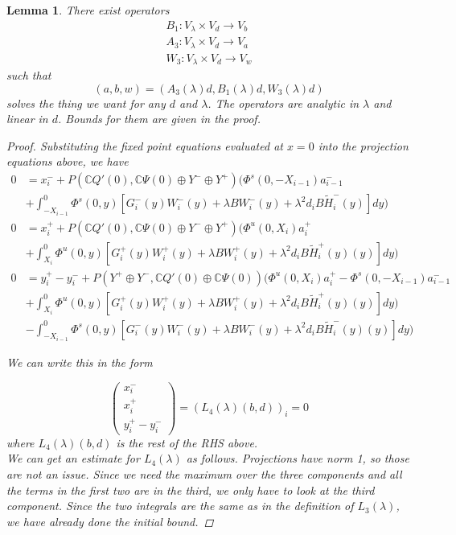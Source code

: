\documentclass[12pt]{article}
\def\C{{\mathbb C}}
\newtheorem{lemma}{Lemma}
\begin{document}
\begin{lemma}
There exist operators 
\begin{align*}
B_1: V_\lambda \times V_d \rightarrow V_b \\
A_3: V_\lambda \times V_d \rightarrow V_a \\
W_3: V_\lambda \times V_d \rightarrow V_w
\end{align*}
such that 
\[
(a,b,w) = (A_3(\lambda)d, B_1(\lambda)d, W_3(\lambda)d)
\]
solves the thing we want for any $d$ and $\lambda$. The operators are analytic in $\lambda$ and linear in $d$. Bounds for them are given in the proof.

\begin{proof}
Substituting the fixed point equations evaluated at $x = 0$ into the projection equations above, we have 
\begin{align*}
0 &= x_i^- + P(\C Q'(0), \C\Psi(0) \oplus Y^- \oplus Y^+) \Big( \Phi^s(0, -X_{i-1})a^-_{i-1}  \\
&+ \int_{-X_{i-1}}^0 \Phi^s(0, y)[G_i^-(y) W_i^-(y) + \lambda B W_i^-(y) + \lambda^2 d_i B \tilde{H}_i^-(y) ] dy \Big) \\
0 &= x_i^+ + P(\C Q'(0), \C\Psi(0) \oplus Y^- \oplus Y^+) \Big( \Phi^u(0, X_i)a^+_{i} \\
&+ \int_{X_{i}}^0 \Phi^u(0, y)[G_i^+(y) W_i^+(y) + \lambda B W_i^+(y) + \lambda^2 d_i B \tilde{H}_i^+(y)(y) ] dy \Big)\\
0 &= y_i^+ - y_i^- + P(Y^+ \oplus Y^-, \C Q'(0) \oplus \C\Psi(0) )\Big( \Phi^u(0, X_i)a^+_{i} - \Phi^s(0, -X_{i-1})a^-_{i-1} \\
&+ \int_{X_{i}}^0 \Phi^u(0, y)[G_i^+(y) W_i^+(y) + \lambda B W_i^+(y) + \lambda^2 d_i B \tilde{H}_i^+(y)(y) ] dy \Big)\\
&- \int_{-X_{i-1}}^0 \Phi^s(0, y)[G_i^-(y) W_i^-(y) + \lambda B W_i^-(y) + \lambda^2 d_i B \tilde{H}_i^-(y)(y) ] dy \Big)
\end{align*}

We can write this in the form

\[ 
\begin{pmatrix}x_i^- \\ x_i^+ \\ y_i^+ - y_i^- \end{pmatrix} = (L_4(\lambda)(b,d))_i = 0
\]
where $L_4(\lambda)(b,d)$ is the rest of the RHS above.\\

We can get an estimate for $L_4(\lambda)$ as follows. Projections have norm 1, so those are not an issue. Since we need the maximum over the three components and all the terms in the first two are in the third, we only have to look at the third component. Since the two integrals are the same as in the definition of $L_3(\lambda)$, we have already done the initial bound.


\end{proof}
\end{lemma}
\end{document}

